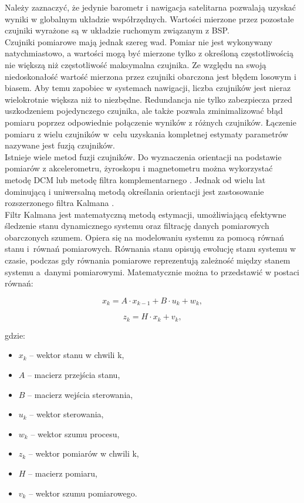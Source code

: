 Należy zaznaczyć, że jedynie barometr i nawigacja satelitarna pozwalają uzyskać wyniki w globalnym układzie współrzędnych. Wartości mierzone przez pozostałe czujniki wyrażone są w układzie ruchomym związanym z BSP.\\

Czujniki pomiarowe mają jednak szereg wad. Pomiar nie jest wykonywany natychmiastowo, a wartości mogą być mierzone tylko z określoną częstotliwością nie większą niż częstotliwość maksymalna czujnika. Ze względu na swoją niedoskonałość wartość mierzona przez czujniki obarczona jest błędem losowym i biasem. Aby temu zapobiec w systemach nawigacji, liczba czujników jest nieraz wielokrotnie większa niż to niezbędne. Redundancja nie tylko zabezpiecza przed uszkodzeniem pojedynczego czujnika, ale także pozwala zminimalizować błąd pomiaru poprzez odpowiednie połączenie wyników z różnych czujników. Łączenie pomiaru z wielu czujników w~celu uzyskania kompletnej estymaty parametrów nazywane jest fuzją czujników.\\

Istnieje wiele metod fuzji czujników. Do wyznaczenia orientacji na podstawie pomiarów z akcelerometru, żyroskopu i magnetometru można wykorzystać metodę DCM \cite{dcm} lub metodę filtra komplementarnego \cite{complementary}. Jednak od wielu lat dominującą i uniwersalną metodą określania orientacji jest zastosowanie rozszerzonego filtra Kalmana \cite{ekf_poor}.\\

Filtr Kalmana jest matematyczną metodą estymacji, umożliwiającą efektywne śledzenie stanu dynamicznego systemu oraz filtrację danych pomiarowych obarczonych szumem.
Opiera się na modelowaniu systemu za pomocą równań stanu i~równań pomiarowych. Równania stanu opisują ewolucję stanu systemu w czasie, podczas gdy równania pomiarowe reprezentują zależność między stanem systemu a~danymi pomiarowymi. Matematycznie można to przedstawić w postaci równań:

\[
  x_k = A \cdot x_{k-1} + B \cdot u_k + w_k,
\]

\[
  z_k = H \cdot x_k + v_k,
\]

gdzie:
\begin{itemize}[noitemsep,nolistsep]
  \item $x_k$ -- wektor stanu w chwili k, 
  \item $A$ -- macierz przejścia stanu, 
  \item $B$  -- macierz wejścia sterowania, 
  \item $u_k$  -- wektor sterowania, 
  \item $w_k$ -- wektor szumu procesu, 
  \item $z_k$  -- wektor pomiarów w chwili  k, 
  \item $H$ -- macierz pomiaru,
  \item $v_k$ -- wektor szumu pomiarowego.
\end{itemize}

